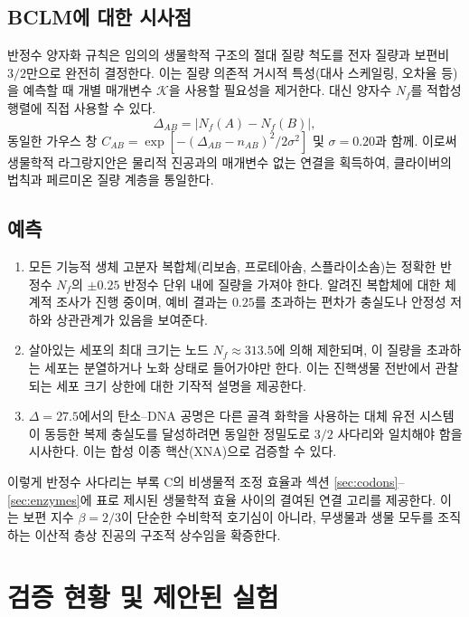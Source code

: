 \documentclass[12pt,a4paper]{article}
\newcommand{\REL}{\mathcal{K}}          %
\begin{document}
	\subsection{BCLM에 대한 시사점}
	반정수 양자화 규칙은 임의의 생물학적 구조의 절대 질량 척도를 전자 질량과 보편비 \(3/2\)만으로 완전히 결정한다. 이는 질량 의존적 거시적 특성(대사 스케일링, 오차율 등)을 예측할 때 개별 매개변수 \(\REL\)을 사용할 필요성을 제거한다. 대신 양자수 \(N_f\)를 적합성 행렬에 직접 사용할 수 있다.
	\[
	\Delta_{AB} = |N_f(A) - N_f(B)|,
	\]
	동일한 가우스 창 \(C_{AB} = \exp[-(\Delta_{AB} - n_{AB})^2/2\sigma^2]\) 및 \(\sigma=0.20\)과 함께. 이로써 생물학적 라그랑지안은 물리적 진공과의 매개변수 없는 연결을 획득하여, 클라이버의 법칙과 페르미온 질량 계층을 통일한다.
	
	\subsection{예측}
	\begin{enumerate}
		\item 모든 기능적 생체 고분자 복합체(리보솜, 프로테아솜, 스플라이소솜)는 정확한 반정수 \(N_f\)의 \(\pm 0.25\) 반정수 단위 내에 질량을 가져야 한다. 알려진 복합체에 대한 체계적 조사가 진행 중이며, 예비 결과는 \(0.25\)를 초과하는 편차가 충실도나 안정성 저하와 상관관계가 있음을 보여준다.
		\item 살아있는 세포의 최대 크기는 노드 \(N_f \approx 313.5\)에 의해 제한되며, 이 질량을 초과하는 세포는 분열하거나 노화 상태로 들어가야만 한다. 이는 진핵생물 전반에서 관찰되는 세포 크기 상한에 대한 기작적 설명을 제공한다.
		\item \(\Delta = 27.5\)에서의 탄소–DNA 공명은 다른 골격 화학을 사용하는 대체 유전 시스템이 동등한 복제 충실도를 달성하려면 동일한 정밀도로 \(3/2\) 사다리와 일치해야 함을 시사한다. 이는 합성 이종 핵산(XNA)으로 검증할 수 있다.
	\end{enumerate}
	
	이렇게 반정수 사다리는 부록 C의 비생물적 조정 효율과 섹션 \ref{sec:codons}–\ref{sec:enzymes}에 표로 제시된 생물학적 효율 사이의 결여된 연결 고리를 제공한다. 이는 보편 지수 \(\beta = 2/3\)이 단순한 수비학적 호기심이 아니라, 무생물과 생물 모두를 조직하는 이산적 층상 진공의 구조적 상수임을 확증한다.
	
	\section{검증 현황 및 제안된 실험}
	\label{sec:validation}
	
\end{document}
